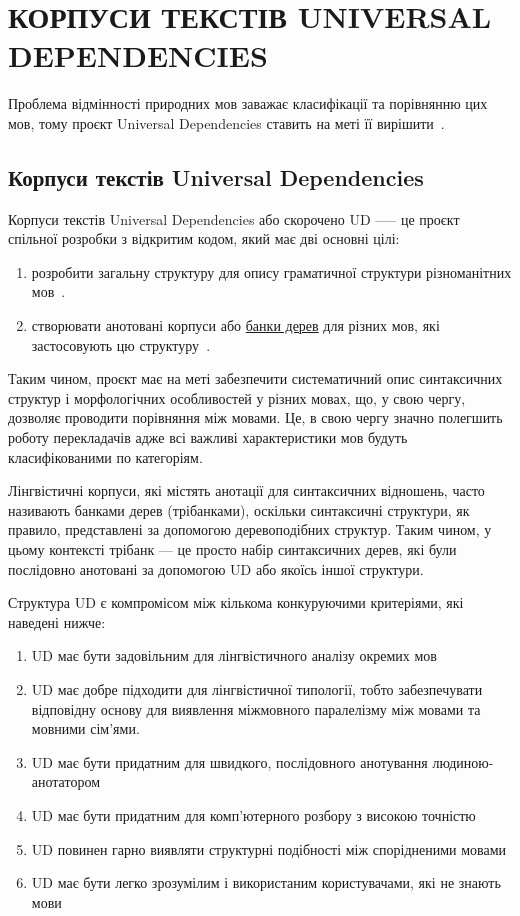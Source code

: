 \section{КОРПУСИ ТЕКСТІВ UNIVERSAL DEPENDENCIES}

Проблема відмінності природних мов заважає класифікації та порівнянню цих мов,
тому проєкт Universal Dependencies ставить на меті її вирішити~\cite{bib18}.

\subsection{Корпуси текстів Universal Dependencies}
Корпуси текстів Universal Dependencies або скорочено UD —-- це проєкт
спільної розробки з відкритим кодом, який має дві основні цілі:

\begin{enumerate}
    \item розробити загальну структуру для опису граматичної структури
    різноманітних мов~\cite{bib1}.
    \item створювати анотовані корпуси або \hyperlink{term0}{банки дерев} для
    різних мов,
    які застосовують цю структуру~\cite{bib2}.
\end{enumerate}

Таким чином, проєкт має на меті забезпечити систематичний опис синтаксичних структур і
морфологічних особливостей у різних мовах, що, у свою чергу, дозволяє проводити порівняння
між мовами. Це, в свою чергу значно полегшить роботу перекладачів
адже всі важливі характеристики мов будуть класифікованими по категоріям.

Лінгвістичні корпуси, які містять анотації для синтаксичних відношень,
часто називають банками дерев (трібанками), оскільки синтаксичні структури, як правило,
представлені за допомогою деревоподібних структур. Таким чином, у цьому контексті трібанк —
це просто набір синтаксичних дерев, які були послідовно анотовані за допомогою UD
або якоїсь іншої структури.

Структура UD є компромісом між кількома конкуруючими критеріями, які наведені нижче:

\begin{enumerate}
    \item UD має бути задовільним для лінгвістичного аналізу окремих мов
    \item UD має добре підходити для лінгвістичної типології, тобто 
    забезпечувати відповідну основу для виявлення міжмовного паралелізму між
    мовами та мовними сім’ями.
    \item UD має бути придатним для швидкого, послідовного анотування людиною-анотатором
    \item UD має бути придатним для комп'ютерного розбору з високою точністю
    \item UD повинен гарно виявляти структурні подібності між спорідненими мовами
    \item UD має бути легко зрозумілим і використаним користувачами, які не знають мови
\end{enumerate}

